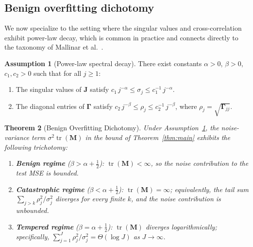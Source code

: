 \documentclass[12pt]{amsart}
\newtheorem{theorem}{Theorem}[section]
\theoremstyle{definition}
\newtheorem{assumption}[theorem]{Assumption}
\theoremstyle{remark}
\DeclareMathOperator{\tr}{tr}
\newcommand{\bJ}{\mathbf{J}}
\newcommand{\bM}{\mathbf{M}}
\begin{document}
\subsection{Benign overfitting dichotomy}

We now specialize to the setting where the singular values and cross-correlation
exhibit power-law decay, which is common in practice and connects directly to
the taxonomy of Mallinar et al.~\cite{MSCBR2022}.

\begin{assumption}[Power-law spectral decay]\label{ass:power-law}
There exist constants $\alpha > 0$, $\beta > 0$, $c_{1}, c_{2} > 0$ such that
for all $j \geq 1$:
\begin{enumerate}
  \item The singular values of $\bJ$ satisfy
    $c_{1}\,j^{-\alpha} \leq \sigma_{j} \leq c_{1}^{-1}\,j^{-\alpha}$.
  \item The diagonal entries of $\boldsymbol{\Gamma}$ satisfy
    $c_{2}\,j^{-\beta} \leq \rho_{j} \leq c_{2}^{-1}\,j^{-\beta}$,
    where $\rho_{j} = \sqrt{\boldsymbol{\Gamma}_{jj}}$.
\end{enumerate}
\end{assumption}

\begin{theorem}[Benign Overfitting Dichotomy]\label{thm:dichotomy}
Under Assumption~\ref{ass:power-law}, the noise-variance term
$\sigma^{2}\tr(\bM)$ in the bound of Theorem~\ref{thm:main} exhibits the
following trichotomy:
\begin{enumerate}
  \item \textbf{Benign regime} ($\beta > \alpha + \tfrac{1}{2}$):
    $\tr(\bM) < \infty$, so the noise contribution to the test MSE is bounded.
  \item \textbf{Catastrophic regime} ($\beta < \alpha + \tfrac{1}{2}$):
    $\tr(\bM) = \infty$; equivalently, the tail sum $\sum_{j > k}\rho_{j}^{2}/\sigma_{j}^{2}$
    diverges for every finite $k$, and the noise contribution is unbounded.
  \item \textbf{Tempered regime} ($\beta = \alpha + \tfrac{1}{2}$):
    $\tr(\bM)$ diverges logarithmically; specifically,
    $\sum_{j=1}^{J} \rho_{j}^{2}/\sigma_{j}^{2} = \Theta(\log J)$ as
    $J \to \infty$.
\end{enumerate}
\end{theorem}
\end{document}
